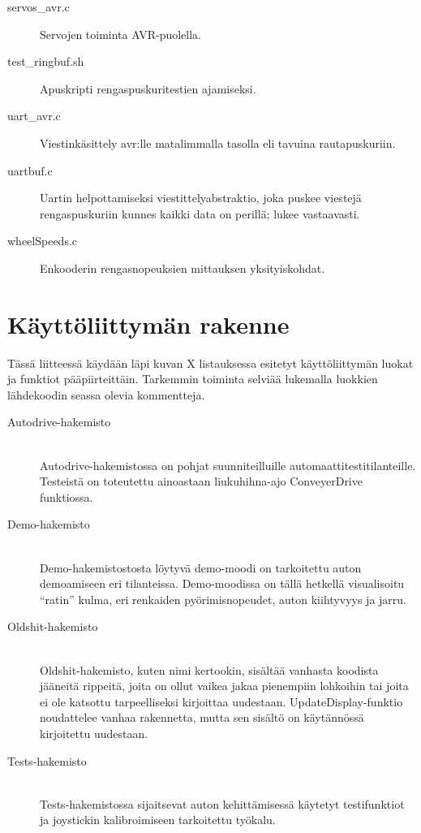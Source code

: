 \documentclass{article}
\begin{document}
\begin{appendices}
\begin{description}
\item[servos\_avr.c] Servojen toiminta AVR-puolella.
\item[test\_ringbuf.sh] Apuskripti rengaspuskuritestien ajamiseksi.
\item[uart\_avr.c] Viestinkäsittely avr:lle matalimmalla tasolla eli tavuina rautapuskuriin.
\item[uartbuf.c] Uartin helpottamiseksi viestittelyabstraktio, joka puskee viestejä rengaspuskuriin kunnes kaikki data on perillä; lukee vastaavasti.
\item[wheelSpeeds.c] Enkooderin rengasnopeuksien mittauksen yksityiskohdat.
\end{description}

\section{Käyttöliittymän rakenne} \label{app:gui}
Tässä liitteessä käydään läpi kuvan X listauksessa esitetyt käyttöliittymän luokat ja funktiot pääpiirteittäin. Tarkemmin toiminta selviää lukemalla luokkien lähdekoodin seassa olevia kommentteja.

\begin{description}
\item[Autodrive-hakemisto] \hfill \\
	Autodrive-hakemistossa on pohjat suunniteilluille automaattitestitilanteille. Testeistä on toteutettu ainoastaan liukuhihna-ajo ConveyerDrive funktiossa.

\item[Demo-hakemisto] \hfill \\
	Demo-hakemistostosta löytyvä demo-moodi on tarkoitettu auton demoamiseen eri tilanteissa. Demo-moodissa on tällä hetkellä visualisoitu ``ratin'' kulma, eri renkaiden pyörimisnopeudet, auton kiihtyvyys ja jarru.

\item[Oldshit-hakemisto] \hfill \\
	Oldshit-hakemisto, kuten nimi kertookin, sisältää vanhasta koodista jääneitä rippeitä, joita on ollut vaikea jakaa pienempiin lohkoihin tai joita ei ole katsottu tarpeelliseksi kirjoittaa uudestaan. UpdateDisplay-funktio noudattelee vanhaa rakennetta, mutta sen sisältö on käytännössä kirjoitettu uudestaan.

\item[Tests-hakemisto] \hfill \\
	Tests-hakemistossa sijaitsevat auton kehittämisessä käytetyt testifunktiot ja joystickin kalibroimiseen tarkoitettu työkalu.


\end{description}
\end{appendices}
\end{document}
